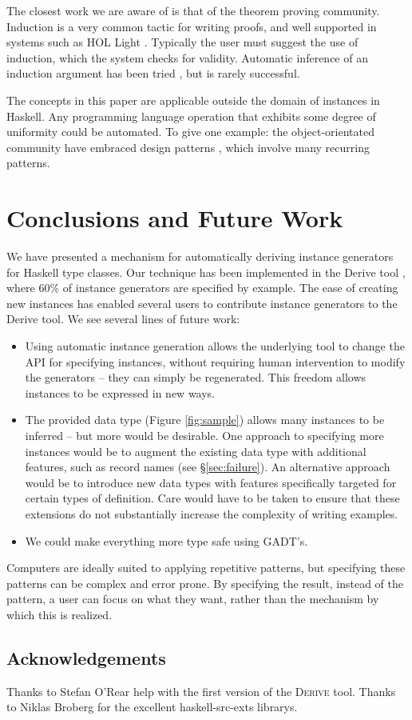 \documentclass[preprint,draft]{sigplanconf}
\newcommand{\derive}{\textsc{Derive}}
\begin{document}
The closest work we are aware of is that of the theorem proving community. Induction is a very common tactic for writing proofs, and well supported in systems such as HOL Light \cite{hol_light}. Typically the user must suggest the use of induction, which the system checks for validity. Automatic inference of an induction argument has been tried \cite{mintchev:reasoning}, but is rarely successful.

The concepts in this paper are applicable outside the domain of instances in Haskell. Any programming language operation that exhibits some degree of uniformity could be automated. To give one example: the object-orientated community have embraced design patterns \cite{design_patterns}, which involve many recurring patterns.

\section{Conclusions and Future Work}
\label{sec:conclusion}

We have presented a mechanism for automatically deriving instance generators for Haskell type classes. Our technique has been implemented in the Derive tool \cite{derive}, where 60\% of instance generators are specified by example. The ease of creating new instances has enabled several users to contribute instance generators to the Derive tool. We see several lines of future work:

\begin{itemize}
\item Using automatic instance generation allows the underlying tool to change the API for specifying instances, without requiring human intervention to modify the generators -- they can simply be regenerated. This freedom allows instances to be expressed in new ways.
\item The provided data type (Figure \ref{fig:sample}) allows many instances to be inferred -- but more would be desirable. One approach to specifying more instances would be to augment the existing data type with additional features, such as record names (see \S\ref{sec:failure}). An alternative approach would be to introduce new data types with features specifically targeted for certain types of definition. Care would have to be taken to ensure that these extensions do not substantially increase the complexity of writing examples.
\item We could make everything more type safe using GADT's.
\end{itemize}

Computers are ideally suited to applying repetitive patterns, but specifying these patterns can be complex and error prone. By specifying the result, instead of the pattern, a user can focus on what they want, rather than the mechanism by which this is realized.

\subsection*{Acknowledgements}

Thanks to Stefan O'Rear help with the first version of the \derive{} tool. Thanks to Niklas Broberg for the excellent haskell-src-exts librarys.




\end{document}
